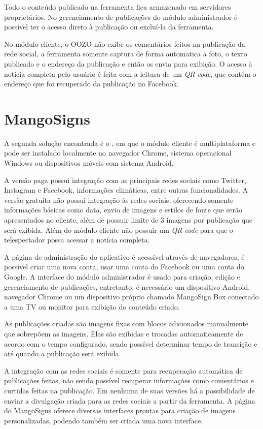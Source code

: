 Todo o conteúdo publicado na ferramenta fica armazenado em servidores proprietários. No gerenciamento de publicações do módulo administrador é possível ter o acesso direto à publicação ou excluí-la da ferramenta.

No módulo cliente, o OOZO não exibe os comentários feitos na publicação da rede social, a ferramenta somente captura de forma automatica a foto, o texto publicado e o endereço da publicação e então os envia para exibição. O acesso à notícia completa pelo usuário é feita com a leitura de um \textit{QR code}, que contém o endereço que foi recuperado da publicação no Facebook.

\section{MangoSigns}
\label{sec:mango}
A segunda solução encontrada é o \citet{mango2017}, em que o módulo cliente é multiplataforma e pode ser instalado localmente no navegador Chrome, sistema operacional Windows ou dispositivos móveis com sistema Android.

A versão paga possui integração com as principais redes sociais como Twitter, Instagram e Facebook, informações climáticas, entre outras funcionalidades. A versão gratuita não possui integração às redes sociais, oferecendo somente informações básicas como data, envio de imagens e estilos de fonte que serão apresentados no cliente, além de possuir limite de 3 imagens por publicação que será exibida. Além do módulo cliente não possuir um \textit{QR code} para que o telespectador possa acessar a notícia completa.

A página de administração do aplicativo é acessível através de navegadores, é possível criar uma nova conta, usar uma conta do Facebook ou uma conta do Google. A interface do módulo administrador é usado para criação, edição e gerenciamento de publicações, entretanto, é necessário um dispositivo Android, navegador Chrome ou um dispositivo próprio chamado MangoSign Box conectado a uma TV ou monitor para exibição do conteúdo criado.

As publicações criadas são imagens fixas com blocos adicionados manualmente que sobrepõem as imagens. Elas são exibidas e trocadas automaticamente de acordo com o tempo configurado, sendo possível determinar tempo de transição e até quando a publicação será exibida.

A integração com as redes sociais é somente para recuperação automática de publicações feitas, não sendo possível recuperar informações como comentários e curtidas feitas na publicação. Em nenhuma de suas versões há a possibilidade de enviar a divulgação criada para as redes sociais a partir da ferramenta. A página do MangoSigns oferece diversas interfaces prontas para criação de imagens personalizadas, podendo também ser criada uma nova interface. 

